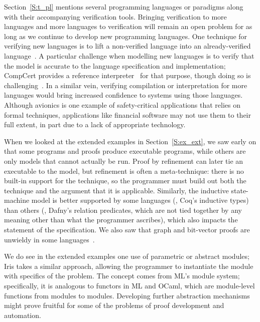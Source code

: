 Section~\ref{S:t_pl} mentions several programming languages or paradigms along
with their accompanying verification tools. Bringing verification to more
languages and more languages to verification will remain an open problem for as
long as we continue to develop new programming languages. One technique for
verifying new languages is to lift a non-verified language into an
already-verified language~\cite{leino2008specification}. A particular challenge
when modelling new languages is to verify that the model is accurate to the
language specification and implementation; CompCert provides a reference
interpreter~\cite{Kastner-LBSSF-2017} for that purpose, though doing so is
challenging~\cite[Chs.\ \emph{Simple Imperative Programs}, \emph{An Evaluation
Function for Imp}]{Pierce:SF1}. In a similar vein, verifying compilation or
interpretation for more languages would bring increased confidence to systems
using those languages. Although avionics is one example of safety-critical
applications that relies on formal techniques, applications like financial
software may not use them to their full extent, in part due to a lack of
appropriate technology.

When we looked at the extended examples in Section~\ref{S:ex_ext}, we saw early
on that some programs and proofs produce executable programs, while others are
only models that cannot actually be run. Proof by refinement can later tie an
executable to the model, but refinement is often a meta-technique: there is no
built-in support for the technique, so the programmer must build out both the
technique and the argument that it is applicable. Similarly, the inductive
state-machine model is better supported by some languages (\eg, Coq's inductive
types) than others (\eg, Dafny's relation predicates, which are not tied
together by any meaning other than what the programmer ascribes), which also
impacts the statement of the specification. We also saw that graph and
bit-vector proofs are unwieldy in some languages~\cite{Morrisett_2012}.

We do see in the extended examples one use of parametric or abstract modules;
Iris takes a similar approach, allowing the programmer to instantiate the module
with specifics of the problem. The concept comes from ML's module system;
specifically, it is analogous to functors in ML and OCaml, which are
module-level functions from modules to modules. Developing further abstraction
mechanisms might prove fruitful for some of the problems of proof development
and automation.

